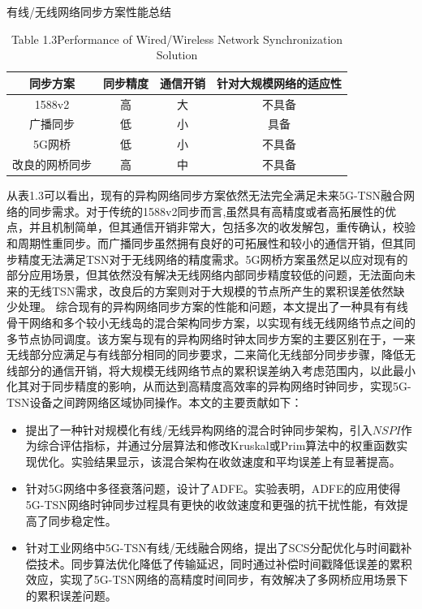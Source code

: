 \documentclass[UTF8,a4paper,12pt]{ctexart}
\numberwithin{equation}{section}
\begin{document}
	\begin{table}[!htbp]
		\centering
		\caption{有线/无线网络同步方案性能总结}
		\vspace{-10pt}
		\caption*{Table 1.3\quad Performance of Wired/Wireless Network Synchronization Solution}
		\begin{tabular}{|c| c|c|c|}
			\hline
			\textbf{同步方案}   &\textbf{同步精度}  & \textbf{通信开销}  & \textbf{针对大规模网络的适应性}  \\
			\hline
			1588v2    & 高   & 大    & 不具备                \\
			\hline
			广播同步 &  低 &  小 & 具备   \\
			\hline
			5G网桥 &低   &小     &不具备  \\
			\hline
			改良的网桥同步 &高  & 中        & 不具备    \\
			\hline
		\end{tabular}
	\end{table}
	
	从表1.3可以看出，现有的异构网络同步方案依然无法完全满足未来5G-TSN融合网络的同步需求。对于传统的1588v2同步而言,虽然具有高精度或者高拓展性的优点，并且机制简单，但其通信开销非常大，包括多次的收发解包，重传确认，校验和周期性重同步。而广播同步虽然拥有良好的可拓展性和较小的通信开销，但其同步精度无法满足TSN对于无线网络的精度需求。5G网桥方案虽然足以应对现有的部分应用场景，但其依然没有解决无线网络内部同步精度较低的问题，无法面向未来的无线TSN需求，改良后的方案则对于大规模的节点所产生的累积误差依然缺少处理。
	综合现有的异构网络同步方案的性能和问题，本文提出了一种具有有线骨干网络和多个较小无线岛的混合架构同步方案，以实现有线无线网络节点之间的多节点协同调度。该方案与现有的异构网络时钟太同步方案的主要区别在于，一来无线部分应满足与有线部分相同的同步要求，二来简化无线部分同步步骤，降低无线部分的通信开销，将大规模无线网络节点的累积误差纳入考虑范围内，以此最小化其对于同步精度的影响，从而达到高精度高效率的异构网络时钟同步，实现5G-TSN设备之间跨网络区域协同操作。本文的主要贡献如下：
	\begin{itemize}
		\item 提出了一种针对规模化有线/无线异构网络的混合时钟同步架构，引入$NSPI$作为综合评估指标，并通过分层算法和修改Kruskal或Prim算法中的权重函数实现优化。实验结果显示，该混合架构在收敛速度和平均误差上有显著提高。
		
		\item 针对5G网络中多径衰落问题，设计了ADFE。实验表明，ADFE的应用使得5G-TSN网络时钟同步过程具有更快的收敛速度和更强的抗干扰性能，有效提高了同步稳定性。
		
		\item 针对工业网络中5G-TSN有线/无线融合网络，提出了SCS分配优化与时间戳补偿技术。同步算法优化降低了传输延迟，同时通过补偿时间戳降低误差的累积效应，实现了5G-TSN网络的高精度时间同步，有效解决了多网桥应用场景下的累积误差问题。
	\end{itemize}
	
\end{document}
